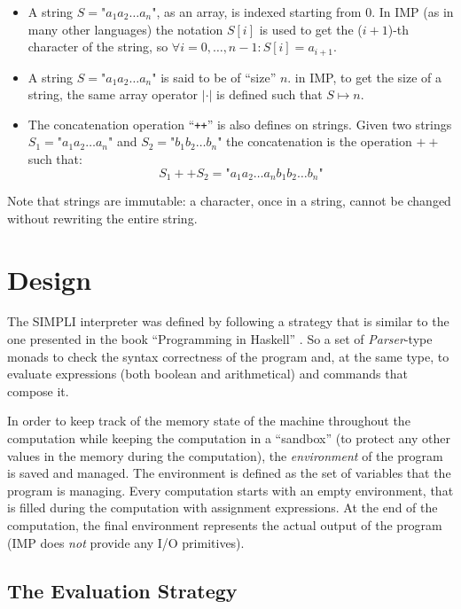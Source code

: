 \documentclass{esposito-documentation}
\begin{document}
\begin{itemize}
	\item A string $S=\texttt{"}a_1a_2\ldots a_n\texttt{"}$, as
		an array, is indexed starting from 0. In IMP (as in many other
		languages) the notation $S[i]$ is used to get the ($i+1$)-th character
		of the string, so $\forall i=0,\ldots,n-1: S[i]=a_{i+1}$. 
	\item A string $S=\texttt{"}a_1a_2\ldots a_n\texttt{"}$ is said to be of ``size'' $n$. in IMP, to
		get the size of a string, the same array operator
		$|\cdot|$ is defined such that $S\mapsto n$.
	\item The concatenation operation ``\texttt{++}'' is also defines on
		strings.  Given two strings $S_1=\texttt{"}a_1a_2\ldots a_n\texttt{"}$
		and $S_2=\texttt{"}b_1b_2\ldots b_n\texttt{"}$ the concatenation is the
		operation $++$ such that:
		\[S_1++S_2=\texttt{"}a_1a_2\ldots a_nb_1b_2\ldots b_n\texttt{"}\]
\end{itemize}

Note that strings are immutable: a character, once in a string, cannot be
changed without rewriting the entire string.

\chapter{Design}

The SIMPLI interpreter was defined by following a strategy that is similar to
the one presented in the book ``Programming in Haskell'' \cite{Hutton2017}. So
a set of \emph{Parser}-type monads to check the syntax correctness of the
program and, at the same type, to evaluate expressions (both boolean and
arithmetical) and commands that compose it.

In order to keep track of the memory state of the machine throughout the
computation while keeping the computation in a ``sandbox'' (to protect any
other values in the memory during the computation), the \emph{environment} of
the program is saved and managed. The environment is defined as the set of
variables that the program is managing. Every computation starts with an empty
environment, that is filled during the computation with assignment expressions.
At the end of the computation, the final environment represents the actual
output of the program (IMP does \emph{not} provide any I/O primitives).

\section{The Evaluation Strategy}
\end{document}
